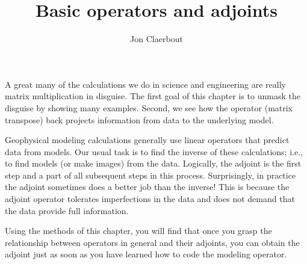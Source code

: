 
\title{Basic operators and adjoints}
\author{Jon Claerbout}
\maketitle

A great many of the calculations
we do in science and engineering
are really matrix multiplication in disguise.
The first goal of this chapter is to unmask the disguise
by showing many examples.
Second, we see how the 
 operator (matrix transpose)
back projects information from data to the underlying model.

\par
Geophysical modeling calculations
generally use linear operators that predict data from models.
Our usual task is to find the inverse of these calculations;
i.e., to find models (or make images) from the data.
Logically, the adjoint is the first step
and a part of all subsequent steps in this  process.
Surprisingly, in practice the adjoint sometimes does a better job
than the inverse!
This is because the adjoint operator tolerates imperfections
in the data and does not demand that the data provide full information.

\par
Using the methods of this chapter,
you will find that
once you grasp the relationship between operators in general
and their adjoints,
you can obtain the adjoint just
as soon as you have learned how to code
the modeling operator.

